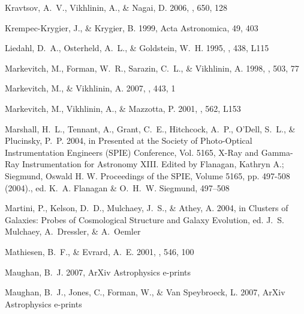 \documentclass[12pt,preprint]{aastex}
\begin{document}
\begin{thebibliography}{}
{Kravtsov}, A.~V., {Vikhlinin}, A., \& {Nagai}, D. 2006, \apj, 650, 128

{Krempec-Krygier}, J., \& {Krygier}, B. 1999, Acta Astronomica, 49, 403

{Liedahl}, D.~A., {Osterheld}, A.~L., \& {Goldstein}, W.~H. 1995, \apjl, 438,
  L115

{Markevitch}, M., {Forman}, W.~R., {Sarazin}, C.~L., \& {Vikhlinin}, A. 1998,
  \apj, 503, 77

{Markevitch}, M., \& {Vikhlinin}, A. 2007, \physrep, 443, 1

{Markevitch}, M., {Vikhlinin}, A., \& {Mazzotta}, P. 2001, \apjl, 562, L153

{Marshall}, H.~L., {Tennant}, A., {Grant}, C.~E., {Hitchcock}, A.~P., {O'Dell},
  S.~L., \& {Plucinsky}, P.~P. 2004, in Presented at the Society of
  Photo-Optical Instrumentation Engineers (SPIE) Conference, Vol. 5165, X-Ray
  and Gamma-Ray Instrumentation for Astronomy XIII. Edited by Flanagan, Kathryn
  A.; Siegmund, Oswald H. W. Proceedings of the SPIE, Volume 5165, pp. 497-508
  (2004)., ed. K.~A. {Flanagan} \& O.~H.~W. {Siegmund}, 497--508

{Martini}, P., {Kelson}, D.~D., {Mulchaey}, J.~S., \& {Athey}, A. 2004, in
  Clusters of Galaxies: Probes of Cosmological Structure and Galaxy Evolution,
  ed. J.~S. {Mulchaey}, A.~{Dressler}, \& A.~{Oemler}

{Mathiesen}, B.~F., \& {Evrard}, A.~E. 2001, \apj, 546, 100

{Maughan}, B.~J. 2007, ArXiv Astrophysics e-prints

{Maughan}, B.~J., {Jones}, C., {Forman}, W., \& {Van Speybroeck}, L. 2007,
  ArXiv Astrophysics e-prints


\end{thebibliography}
\end{document}
